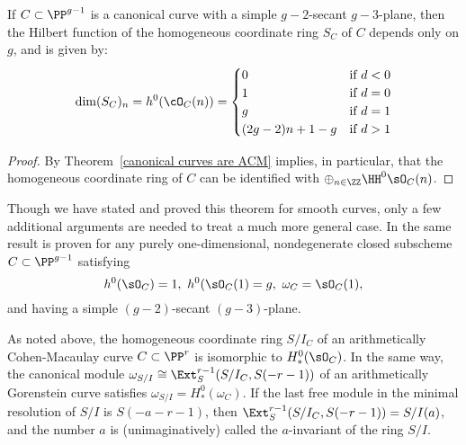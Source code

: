 \begin{corollary}\label{canonical hilbert function}
If $C\subset \PP^{g-1}$ is a canonical curve with a simple $g-2$-secant $g-3$-plane, then the Hilbert function of the homogeneous coordinate ring $S_{C}$ of  $C$ depends only on $g$, and is given by:
$$
\dim({S_{C}})_{n} = h^{0}(\cO_{C}(n)) = 
\begin{cases}
 0 &\mbox {if } d<0\\
 1 & \mbox {if }  d=0\\
 g & \mbox {if }  d=1\\
 (2g-2)n + 1 - g & \mbox {if }  d>1\\
\end{cases}
$$
\end{corollary}
\begin{proof}
By Theorem~\ref{canonical curves are ACM} implies, in particular, that the homogeneous coordinate ring of $C$ can be identified with $\oplus_{n\in \ZZ}\HH^0\sO_C(n)$.  
\end{proof}

\begin{fact}
Though we have stated and proved this theorem for smooth curves,
only a few additional arguments are needed to treat a much more  general case. In \cite{Schreyer} 
the same result is proven for
any purely one-dimensional, nondegenerate closed subscheme $C\subset \PP^{g-1}$ satisfying
$$
 h^{0}(\sO_{C}) = 1,\ h^{0}(\sO_{C}(1) = g, \ \omega_{C} = \sO_{C}(1),
$$ 
and having a simple $(g-2)$-secant $(g-3)$-plane.
\end{fact}
 
 As noted above, the homogeneous coordinate ring $S/I_C$ of an arithmetically Cohen-Macaulay curve $C\subset \PP^r$ is isomorphic
 to $H^0_*(\sO_C)$. In the same way, the canonical module $\omega_{S/I} \cong \Ext_S^{r-1}(S/I_C, S(-r-1))$ of an arithmetically Gorenstein curve satisfies
 $\omega_{S/I} = H^0_*(\omega_C)$.  If the last free module in the minimal resolution of $S/I$ is $S(-a-r-1)$,
 then $\Ext_S^{r-1}(S/I_C, S(-r-1)) = S/I(a)$, and the number $a$ is (unimaginatively) called the $a$-invariant
 of the ring $S/I$. 
 
